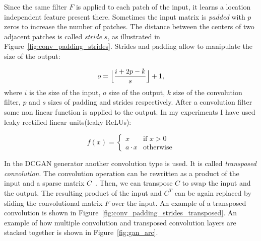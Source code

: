 Since the same filter $F$ is applied to each patch of the input, it learns a location independent feature present there. Sometimes the input matrix is \textit{padded} with $p$ zeros to increase the number of patches. The distance between the centers of two adjacent patches is called \textit{stride} $s$, as illustrated in Figure~\ref{fig:conv_padding_strides}. Strides and padding allow to manipulate the size of the output:

\begin{equation}
	o = \Bigl\lfloor \frac{i + 2p - k}{s} \Bigr\rfloor + 1,
\end{equation}
where $i$ is the size of the input, $o$ size of the output, $k$ size of the convolution filter, $p$ and $s$ sizes of padding and strides respectively. After a convolution filter some non linear function is applied to the output. In my experiments I have used leaky rectified linear units(leaky ReLUs): 

\begin{equation}
	f(x) = \begin{cases}
			x & \text{if }x > 0\\
			a \cdot x &\text{otherwise}
			\end{cases}	
\end{equation}

In the DCGAN generator another convolution type is used. It is called \textit{transposed convolution}. The convolution operation can be rewritten as a product of the input and a sparse matrix $C$~\cite{conv_tutorial}. Then, we can transpose $C$ to swap the input and the output. The resulting product of the input and $C^T$ can be again replaced by sliding the convolutional matrix $F$ over the input. An example of a transposed convolution is shown in Figure~\ref{fig:conv_padding_strides_transposed}. An example of how multiple convolution and transposed convolution layers are stacked together is shown in Figure~\ref{fig:gan_arc}.

